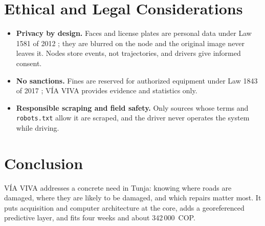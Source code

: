 \documentclass[journal,10pt]{IEEEtran}
\begin{document}
\section{Ethical and Legal Considerations}
\begin{itemize}
\item \textbf{Privacy by design.} Faces and license plates are personal data under Law 1581 of 2012 \cite{ley1581}; they are blurred on the node and the original image never leaves it. Nodes store events, not trajectories, and drivers give informed consent.
\item \textbf{No sanctions.} Fines are reserved for authorized equipment under Law 1843 of 2017 \cite{ley1843}; V\'IA VIVA provides evidence and statistics only.
\item \textbf{Responsible scraping and field safety.} Only sources whose terms and \texttt{robots.txt} allow it are scraped, and the driver never operates the system while driving.
\end{itemize}

\section{Conclusion}
V\'IA VIVA addresses a concrete need in Tunja: knowing where roads are damaged, where they are likely to be damaged, and which repairs matter most. It puts acquisition and computer architecture at the core, adds a georeferenced predictive layer, and fits four weeks and about 342\,000~COP.


\end{document}
